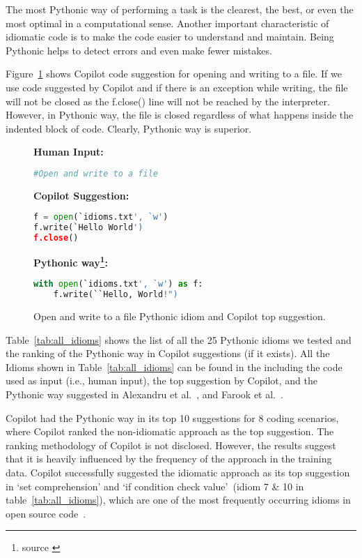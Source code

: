 The most Pythonic way of performing a task is the clearest, the best, or even the most optimal in a computational sense.
Another important characteristic of idiomatic code is to make the code easier to understand and maintain. Being Pythonic helps to detect errors and even make fewer mistakes.

Figure~\ref{fig:idioms_2} shows Copilot code suggestion for opening and writing to a file. 
If we use code suggested by Copilot and if there is an exception while writing, the file will not be closed as the f.close() line will not be reached by the interpreter.
However, in Pythonic way, the file is closed regardless of what happens inside the indented block of code. Clearly, Pythonic way is superior.

\begin{figure}[hbt!]
    \centering
\begin{tcolorbox}[title=Open and write to a file,boxsep=.25mm]
\textbf{Human Input:}
\begin{lstlisting}[language={Python}]
#Open and write to a file
\end{lstlisting}
\tcbline
\textbf{Copilot Suggestion:}
\begin{lstlisting}[language=Python,escapechar=\%]
f = open(`idioms.txt', `w')
f.write(`Hello World')
f.close()
\end{lstlisting}
\tcbline
\textbf{Pythonic way\footnote{source \cite{Alexandru2018}}:}
\begin{lstlisting}[language=Python]
with open(`idioms.txt', `w') as f:
    f.write(``Hello, World!")
\end{lstlisting}
\end{tcolorbox}
    \caption{Open and write to a file Pythonic idiom and Copilot top suggestion.}
    \label{fig:idioms_2}
\end{figure}

Table~\ref{tab:all_idioms} shows the list of all the 25 Pythonic idioms we tested and the ranking of the Pythonic way in Copilot suggestions (if it exists).
All the Idioms shown in Table~\ref{tab:all_idioms} can be found in the \repl{} including the code used as input (i.e., human input), the top suggestion by Copilot, and the Pythonic way suggested in Alexandru et al.~\cite{Alexandru2018}, and Farook et al.~\cite{idioms}. 

Copilot had the Pythonic way in its top 10 suggestions for 8 coding scenarios, where Copilot ranked the non-idiomatic approach as the top suggestion. 
The ranking methodology of Copilot is not disclosed. However, the results suggest that it is heavily influenced by the frequency of the approach in the training data. 
Copilot successfully suggested the idiomatic approach as its top suggestion in `set comprehension' and `if condition check value'~(idiom 7 \& 10 in table~\ref{tab:all_idioms}), which are one of the most frequently occurring idioms in open source code~\cite{Alexandru2018}.

